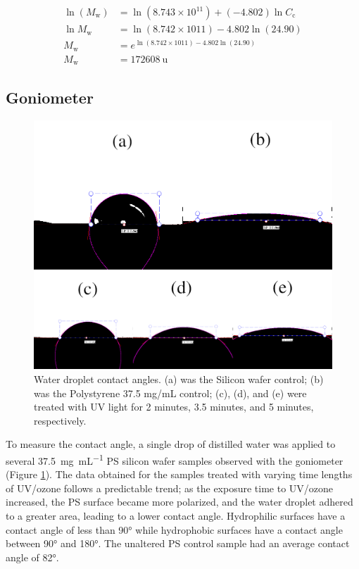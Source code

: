 \documentclass[twocolumn]{article}
\begin{document}
                \begin{align}
                    \ln{(M_\text{w})} &= \ln{(8.743 \times 10^{11})} + (- 4.802) \ln{C_\text{c}}\\
                    \ln{M_\text{w}} &= \ln{(8.742 \times 1011)} - 4.802 \ln{(24.90)} \nonumber\\
                    M_\text{w} &= e^{\ln{(8.742 \times 1011)} - 4.802 \ln{(24.90)}} \nonumber\\
                    M_\text{w} &= \qty{172608}{\atomicmassunit} \nonumber
                \end{align}

            \subsection{Goniometer}
                \begin{figure}
                    \centering
                    \includegraphics[width=0.8\columnwidth]{img/contact.png}
                    \caption{Water droplet contact angles. (a) was the Silicon wafer control; (b) was the Polystyrene 37.5 mg/mL control; (c), (d), and (e) were treated with UV light for 2 minutes, 3.5 minutes, and 5 minutes, respectively.}\label{fig:contact}
                \end{figure}
                To measure the contact angle, a single drop of distilled water was applied to several \qty{37.5}{\milli\gram\per\milli\liter} PS silicon wafer samples observed with the goniometer (Figure \ref{fig:contact}). The data obtained for the samples treated with varying time lengths of UV/ozone follows a predictable trend; as the exposure time to UV/ozone increased, the PS surface became more polarized, and the water droplet adhered to a greater area, leading to a lower contact angle. Hydrophilic surfaces have a contact angle of less than 90° while hydrophobic surfaces have a contact angle between 90° and 180°. The unaltered PS control sample had an average contact angle of 82°.
\end{document}
